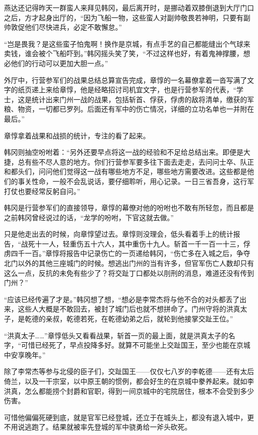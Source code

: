 燕达还记得昨天一群蛮人来拜见韩冈，最后离开时，是挪动着双膝倒退到大厅门口之后，方才起身出厅的，“因为飞船一物，这些蛮人对副帅敬畏若神明，只要有副帅敦促他们尽快进兵，必定不敢懈怠。”

“岂是畏我？是这些蛮子怕鬼啊！换作是京城，有点手艺的自己都能缝出个气球来卖钱，谁会被个飞船吓到。”韩冈摇头笑了笑，“不过这样也好，有着鬼神撑腰，想必他们的行动可以更加大胆一点。”

外厅中，行营参军们的战果总结总算宣告完成，章惇的一名幕僚拿着一沓写满了文字的纸页递上来给章惇，他是经略招讨司机宜文字，也是行营参军的代表，“学士，这是统计出来门州一战的战果，包括斩首、俘获，俘虏的敌将清单，缴获的军粮、物资，一切都已罗列。后面还有军中的伤亡情况，详细的立功名单也一并附在最后。”

章惇拿着战果和战损的统计，专注的看了起来。

韩冈则抽空吩咐着：“另外还要早点将这一战的经验和不足给总结出来。即便是大捷，总有些不尽人意的地方。你们行营参军要多往下面去走走，去问问士卒、队正和都头们，问问他们觉得这一战有哪些地方不足，哪些地方需要改进。这些都是他们的事关性命，一般不会乱说话，要仔细聆听，用心记录。一日三省吾身，这行军打仗也要经常反躬自问。”

韩冈是行营参军们的直接领导，章惇的幕僚对他的吩咐也不敢有所轻忽，而且都是之前韩冈曾经说过的话，“龙学的吩咐，下官这就去做。”

只是他走出去的时候，向章惇望过去。章惇则没理会，低头看着手上的统计报告，“战死十一人，轻重伤五十六人，其中重伤十九人。斩首一千一百一十三，俘虏四千一百。”章惇将报告中记录伤亡的一页递给韩冈，“伤亡多在入城之后，争夺北门以外的其他三座城门的时候。想逃出门州的当有许多，但官军伤亡人数却只有这么一点，反抗的未免有些少了？将交趾丁口都处以刖刑的消息，难道还没有传到门州？”

“应该已经传遍了才是。”韩冈想了想，“想必是李常杰将与他不合的对头都丢了出来，这些人大概是不敢回去，被封了城门后也就不想拼命了。门州守将的洪真太子，是乾德的亲叔，乾德若死，在乾德幼弟之后，就轮到他接掌交趾王位。”

“洪真太子……”章惇低头又看看战果，斩首一页的最上面，就是洪真太子的名字，“可惜已经死了，早点投降多好。就算不可能坐上交趾国王，至少也能在京城中安享晚年。”

除了李常杰等参与北侵的臣子们，交趾国王——仅仅七八岁的李乾德——还有太后倚兰，以及一干宗室，以中原王朝的惯例，都会好生的在京城中豢养起来。就如李洪真，怎么都能捞个封爵和官职，得到一间京城中的宅院居住，根本不会受到多少伤害。

可惜他偏偏死硬到底，就是官军已经登城，还立于在城头上，都没有退入城中，更不用说逃跑了。结果就被率先登城的军中骁勇给一斧头砍死。

